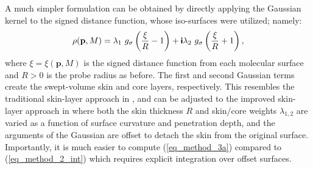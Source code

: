 \documentclass[article]{gmp2014}
\theoremstyle{definition}
\newcommand{\ii}{\text{\textsf{\textbf{i}}}}
\begin{document}
A much simpler formulation can be obtained by directly applying the Gaussian kernel to the signed distance function, whose iso-surfaces were utilized; namely:
%
\begin{equation}
    \rho(\mathbf{p}, M) = \lambda_1 ~ g_\sigma \left( \frac{\xi}{R} - 1 \right) +\ii \lambda_2 ~ g_\sigma \left( \frac{\xi}{R} + 1 \right), \label{eq_method_3a}
\end{equation}
%
where $\xi = \xi(\mathbf{p}, M)$ is the signed distance function from each molecular surface and $R > 0$ is the probe radius as before. The first and second Gaussian terms create the swept-volume skin and core layers, respectively. This resembles the traditional skin-layer approach in \cite{Bajaj2011}, and can be adjusted to the improved skin-layer approach in \cite{Bajaj2013} where both the skin thickness $R$ and skin/core weights $\lambda_{1,2}$ are varied as a function of surface curvature and penetration depth, and the arguments of the Gaussian are offset to detach the skin from the original surface. Importantly, it is much easier to compute (\ref{eq_method_3a}) compared to (\ref{eq_method_2_int}) which requires explicit integration over offset surfaces.
\end{document}

